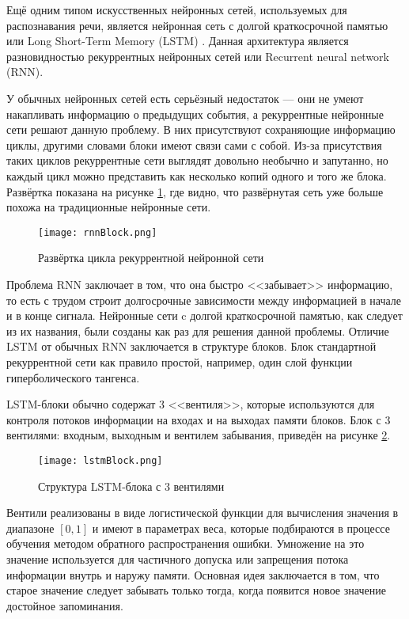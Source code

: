 Ещё одним типом искусственных нейронных сетей, используемых для распознавания речи, является нейронная сеть с долгой краткосрочной памятью или Long Short-Term Memory (LSTM) \cite{hochreiter1997long}.
Данная архитектура является разновидностью рекуррентных нейронных сетей или Recurrent neural network (RNN).

У обычных нейронных сетей есть серьёзный недостаток --- они не умеют накапливать информацию о предыдущих события, а рекуррентные нейронные сети решают данную проблему.
В них присутствуют сохраняющие информацию циклы, другими словами блоки имеют связи сами с собой.
Из-за присутствия таких циклов рекуррентные сети выглядят довольно необычно и запутанно, но каждый цикл можно представить как несколько копий одного и того же блока.
Развёртка показана на рисунке \ref{fig:rnnBlock}, где видно, что развёрнутая сеть уже больше похожа на традиционные нейронные сети.

\begin{figure}[h]
	\centering
	\texttt{[image: rnnBlock.png]}
	\caption{Развёртка цикла рекуррентной нейронной сети}
	\label{fig:rnnBlock}
\end{figure}

Проблема RNN заключает в том, что она быстро <<забывает>> информацию, то есть с трудом строит долгосрочные зависимости между информацией в начале и в конце сигнала.
Нейронные сети c долгой краткосрочной памятью, как следует из их названия, были созданы как раз для решения данной проблемы.
Отличие LSTM от обычных RNN заключается в структуре блоков.
Блок стандартной рекуррентной сети как правило простой, например, один слой функции гиперболического тангенса.

LSTM-блоки обычно содержат 3 <<вентиля>>, которые используются для контроля потоков информации на входах и на выходах памяти блоков.
Блок с 3 вентилями: входным, выходным и вентилем забывания, приведён на рисунке \ref{fig:lstmBlock}.

\begin{figure}[h]
	\centering
	\texttt{[image: lstmBlock.png]}
	\caption{Структура LSTM-блока с 3 вентилями}
	\label{fig:lstmBlock}
\end{figure}

Вентили реализованы в виде логистической функции для вычисления значения в диапазоне $[0, 1]$ и имеют в параметрах веса, которые подбираются в процессе обучения методом обратного распространения ошибки.
Умножение на это значение используется для частичного допуска или запрещения потока информации внутрь и наружу памяти.
Основная идея заключается в том, что старое значение следует забывать только тогда, когда появится новое значение достойное запоминания.

